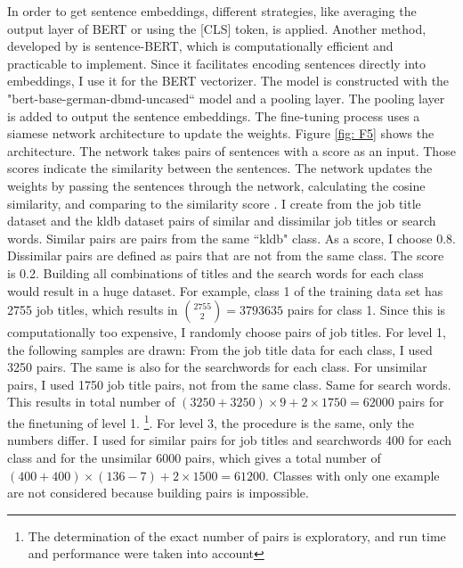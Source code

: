 \documentclass[12pt, a4paper, titlepage]{article}
\begin{document}
In order to get sentence embeddings, different strategies, like averaging the output layer of \ac{BERT} or using the [CLS] token, is applied. Another method, developed by \citet{reimers2019} is sentence-\ac{BERT}, which is computationally efficient and practicable to implement. Since it facilitates encoding sentences directly into embeddings, I use it for the \ac{BERT} vectorizer. The model is constructed with the "bert-base-german-dbmd-uncased`` model and a pooling layer. The pooling layer is added to output the sentence embeddings. The fine-tuning process uses a siamese network architecture to update the weights. Figure \ref{fig: F5} shows the architecture. The network takes pairs of sentences with a score as an input. Those scores indicate the similarity between the sentences. The network updates the weights by passing the sentences through the network, calculating the cosine similarity, and comparing to the similarity score \citep{reimers2019}.
I create from the job title dataset and the kldb dataset pairs of similar and dissimilar job titles or search words. Similar pairs are pairs from the same ``kldb" class. As a score, I choose 0.8. Dissimilar pairs are defined as pairs that are not from the same class. The score is 0.2. Building all combinations of titles and the search words for each class would result in a huge dataset. For example, class 1 of the training data set has 2755 job titles, which results in ${2755 \choose 2} = 3793635$ pairs for class 1. Since this is computationally too expensive, I randomly choose pairs of job titles. For level 1, the following samples are drawn: From the job title data for each class, I used 3250 pairs. The same is also for the searchwords for each class. For unsimilar pairs, I used 1750 job title pairs, not from the same class. Same for search words. This results in total number of $(3250+3250) \times 9 + 2 \times 1750 = 62000$ pairs for the finetuning of level 1. \footnote{The determination of the exact number of pairs is exploratory, and run time and performance were taken into account}. For level 3, the procedure is the same, only the numbers differ. I used for similar pairs for job titles and searchwords 400 for each class and for the unsimilar 6000 pairs, which gives a total number of $(400 + 400) \times (136-7) + 2 \times 1500 =  61200$. Classes with only one example are not considered because building pairs is impossible. 
\end{document}
